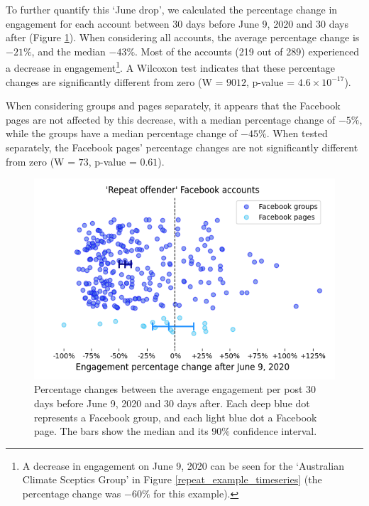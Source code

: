 \documentclass[11pt,a4paper]{article}
\begin{document}
To further quantify this ‘June drop’, we calculated the percentage change in engagement for each account between 30 days before June 9, 2020 and 30 days after (Figure \ref{repeat_june_drop_percentage_change}). 
When considering all accounts, the average percentage change is $-21\%$, and the median $-43\%$. Most of the accounts (219 out of 289) experienced a decrease in engagement\footnote{A decrease in engagement on June 9, 2020 can be seen for the `Australian Climate Sceptics Group' in Figure \ref{repeat_example_timeseries} (the percentage change was $-60\%$ for this example).}.
A Wilcoxon test indicates that these percentage changes are significantly different from zero (W = $9012$, p-value = $4.6 \times 10^{-17}$).

When considering groups and pages separately, it appears that the Facebook pages are not affected by this decrease, with a median percentage change of $-5\%$, while the groups have a median percentage change of $-45\%$. 
When tested separately, the Facebook pages' percentage changes are not significantly different from zero (W = $73$, p-value = $0.61$).


\begin{figure}[!h]
\centering
\includegraphics[width=\linewidth]{./../figure/repeat_june_drop_percentage_change.png}
\caption{Percentage changes between the average engagement per post 30 days before June 9, 2020 and 30 days after. 
Each deep blue dot represents a Facebook group, and each light blue dot a Facebook page.
The bars show the median and its $90\%$ confidence interval.}
\label{repeat_june_drop_percentage_change}
\end{figure}
\end{document}
